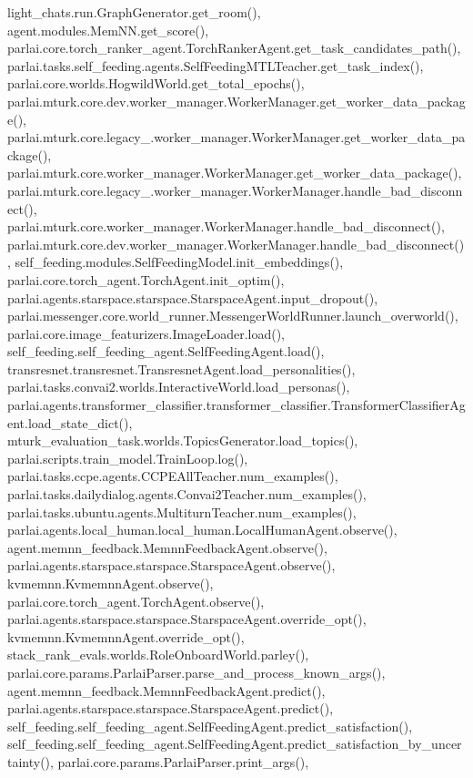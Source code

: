 light\+\_\+chats.\+run.\+Graph\+Generator.\+get\+\_\+room(), agent.\+modules.\+Mem\+N\+N.\+get\+\_\+score(), parlai.\+core.\+torch\+\_\+ranker\+\_\+agent.\+Torch\+Ranker\+Agent.\+get\+\_\+task\+\_\+candidates\+\_\+path(), parlai.\+tasks.\+self\+\_\+feeding.\+agents.\+Self\+Feeding\+M\+T\+L\+Teacher.\+get\+\_\+task\+\_\+index(), parlai.\+core.\+worlds.\+Hogwild\+World.\+get\+\_\+total\+\_\+epochs(), parlai.\+mturk.\+core.\+dev.\+worker\+\_\+manager.\+Worker\+Manager.\+get\+\_\+worker\+\_\+data\+\_\+package(), parlai.\+mturk.\+core.\+legacy\+\_.\+worker\+\_\+manager.\+Worker\+Manager.\+get\+\_\+worker\+\_\+data\+\_\+package(), parlai.\+mturk.\+core.\+worker\+\_\+manager.\+Worker\+Manager.\+get\+\_\+worker\+\_\+data\+\_\+package(), parlai.\+mturk.\+core.\+legacy\+\_.\+worker\+\_\+manager.\+Worker\+Manager.\+handle\+\_\+bad\+\_\+disconnect(), parlai.\+mturk.\+core.\+worker\+\_\+manager.\+Worker\+Manager.\+handle\+\_\+bad\+\_\+disconnect(), parlai.\+mturk.\+core.\+dev.\+worker\+\_\+manager.\+Worker\+Manager.\+handle\+\_\+bad\+\_\+disconnect(), self\+\_\+feeding.\+modules.\+Self\+Feeding\+Model.\+init\+\_\+embeddings(), parlai.\+core.\+torch\+\_\+agent.\+Torch\+Agent.\+init\+\_\+optim(), parlai.\+agents.\+starspace.\+starspace.\+Starspace\+Agent.\+input\+\_\+dropout(), parlai.\+messenger.\+core.\+world\+\_\+runner.\+Messenger\+World\+Runner.\+launch\+\_\+overworld(), parlai.\+core.\+image\+\_\+featurizers.\+Image\+Loader.\+load(), self\+\_\+feeding.\+self\+\_\+feeding\+\_\+agent.\+Self\+Feeding\+Agent.\+load(), transresnet.\+transresnet.\+Transresnet\+Agent.\+load\+\_\+personalities(), parlai.\+tasks.\+convai2.\+worlds.\+Interactive\+World.\+load\+\_\+personas(), parlai.\+agents.\+transformer\+\_\+classifier.\+transformer\+\_\+classifier.\+Transformer\+Classifier\+Agent.\+load\+\_\+state\+\_\+dict(), mturk\+\_\+evaluation\+\_\+task.\+worlds.\+Topics\+Generator.\+load\+\_\+topics(), parlai.\+scripts.\+train\+\_\+model.\+Train\+Loop.\+log(), parlai.\+tasks.\+ccpe.\+agents.\+C\+C\+P\+E\+All\+Teacher.\+num\+\_\+examples(), parlai.\+tasks.\+dailydialog.\+agents.\+Convai2\+Teacher.\+num\+\_\+examples(), parlai.\+tasks.\+ubuntu.\+agents.\+Multiturn\+Teacher.\+num\+\_\+examples(), parlai.\+agents.\+local\+\_\+human.\+local\+\_\+human.\+Local\+Human\+Agent.\+observe(), agent.\+memnn\+\_\+feedback.\+Memnn\+Feedback\+Agent.\+observe(), parlai.\+agents.\+starspace.\+starspace.\+Starspace\+Agent.\+observe(), kvmemnn.\+Kvmemnn\+Agent.\+observe(), parlai.\+core.\+torch\+\_\+agent.\+Torch\+Agent.\+observe(), parlai.\+agents.\+starspace.\+starspace.\+Starspace\+Agent.\+override\+\_\+opt(), kvmemnn.\+Kvmemnn\+Agent.\+override\+\_\+opt(), stack\+\_\+rank\+\_\+evals.\+worlds.\+Role\+Onboard\+World.\+parley(), parlai.\+core.\+params.\+Parlai\+Parser.\+parse\+\_\+and\+\_\+process\+\_\+known\+\_\+args(), agent.\+memnn\+\_\+feedback.\+Memnn\+Feedback\+Agent.\+predict(), parlai.\+agents.\+starspace.\+starspace.\+Starspace\+Agent.\+predict(), self\+\_\+feeding.\+self\+\_\+feeding\+\_\+agent.\+Self\+Feeding\+Agent.\+predict\+\_\+satisfaction(), self\+\_\+feeding.\+self\+\_\+feeding\+\_\+agent.\+Self\+Feeding\+Agent.\+predict\+\_\+satisfaction\+\_\+by\+\_\+uncertainty(), parlai.\+core.\+params.\+Parlai\+Parser.\+print\+\_\+args(), 